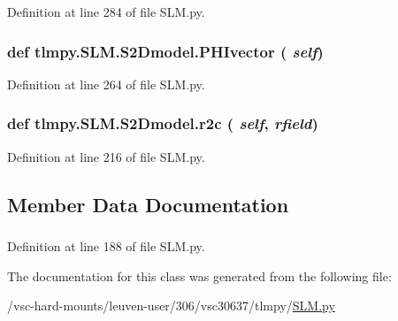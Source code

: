 Definition at line 284 of file SLM.py.\hypertarget{classtlmpy_1_1SLM_1_1S2Dmodel_a43174f6fbd7e8331409bed870e836d51}{
\subsubsection[{PHIvector}]{\setlength{\rightskip}{0pt plus 5cm}def tlmpy.SLM.S2Dmodel.PHIvector ( {\em self})}}
\label{classtlmpy_1_1SLM_1_1S2Dmodel_a43174f6fbd7e8331409bed870e836d51}


Definition at line 264 of file SLM.py.\hypertarget{classtlmpy_1_1SLM_1_1S2Dmodel_acbce9381b975aab5447ce41672bdb5c4}{
\subsubsection[{r2c}]{\setlength{\rightskip}{0pt plus 5cm}def tlmpy.SLM.S2Dmodel.r2c ( {\em self}, \/   {\em rfield})}}
\label{classtlmpy_1_1SLM_1_1S2Dmodel_acbce9381b975aab5447ce41672bdb5c4}


Definition at line 216 of file SLM.py.

\subsection{Member Data Documentation}
\hypertarget{classtlmpy_1_1SLM_1_1S2Dmodel_a02de4f45491bb68d1ced96d4227ec756}{
\subsubsection[{PHI}]{}}
\label{classtlmpy_1_1SLM_1_1S2Dmodel_a02de4f45491bb68d1ced96d4227ec756}


Definition at line 188 of file SLM.py.

The documentation for this class was generated from the following file:\begin{DoxyCompactItemize}
\item 
/vsc-\/hard-\/mounts/leuven-\/user/306/vsc30637/tlmpy/\hyperlink{SLM_8py}{SLM.py}\end{DoxyCompactItemize}
